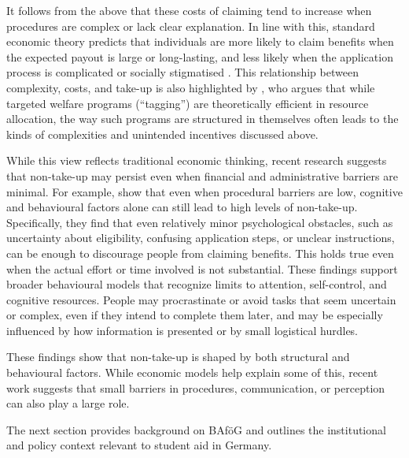 It follows from the above that these costs of claiming tend to increase when procedures are complex or lack clear explanation. In line with this, standard economic theory predicts that individuals are more likely to claim benefits when the expected payout is large or long-lasting, and less likely when the application process is complicated or socially stigmatised \citep{janssens_totake_2022, booij_role_2012}. This relationship between complexity, costs, and take-up is also highlighted by \cite{akerlof_tagging_1978}, who argues that while targeted welfare programs (“tagging”) are theoretically efficient in resource allocation, the way such programs are structured in themselves often leads to the kinds of complexities and unintended incentives discussed above.

While this view reflects traditional economic thinking, recent research suggests that non-take-up may persist even when financial and administrative barriers are minimal. 
For example, \cite{bhargava_psychological_2015} show that even when procedural barriers are low, cognitive and behavioural factors alone can still lead to high levels of non-take-up. 
Specifically, they find that even relatively minor psychological obstacles, such as uncertainty about eligibility, confusing application steps, or unclear instructions, can be enough to discourage people from claiming benefits. 
This holds true even when the actual effort or time involved is not substantial. 
These findings support broader behavioural models that recognize limits to attention, self-control, and cognitive resources. 
People may procrastinate or avoid tasks that seem uncertain or complex, even if they intend to complete them later, and may be especially influenced by how information is presented or by small logistical hurdles.

These findings show that non-take-up is shaped by both structural and behavioural factors. 
While economic models help explain some of this, recent work suggests that small barriers in procedures, communication, or perception can also play a large role.



The next section provides background on BAföG and outlines the institutional and policy context relevant to student aid in Germany.

